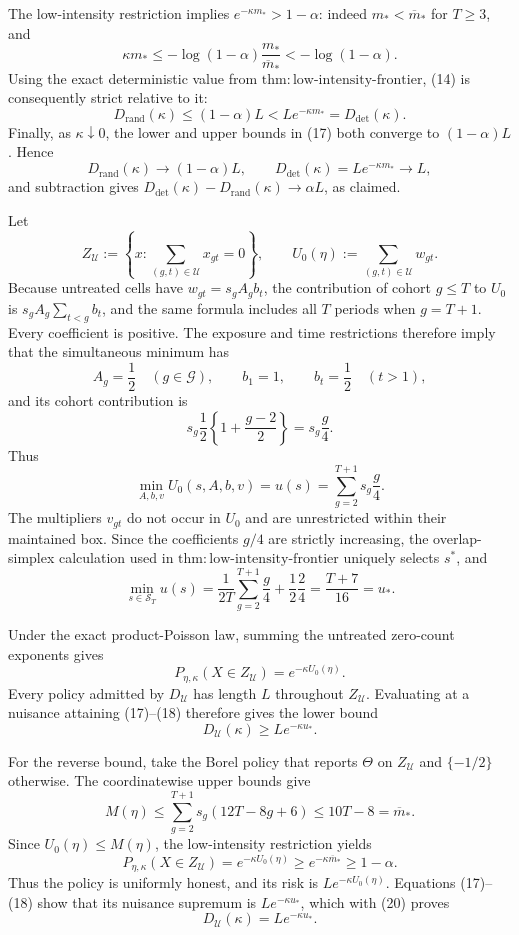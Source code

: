 The low-intensity restriction implies
\(e^{-\kappa m_*}>1-\alpha\): indeed \(m_*<\overline m_*\) for \(T\ge3\), and
\[
 \kappa m_*\le-\log(1-\alpha)\frac{m_*}{\overline m_*}
 <-\log(1-\alpha).
\]
Using the exact deterministic value from \(\mathrm{thm{:}low\text{-}intensity\text{-}frontier}\), (14) is consequently strict relative to it:
\[
 D_{\mathrm{rand}}(\kappa)\le(1-\alpha)L
 <Le^{-\kappa m_*}=D_{\mathrm{det}}(\kappa).
\]
Finally, as \(\kappa\downarrow0\), the lower and upper bounds in (17) both converge to \((1-\alpha)L\).  Hence
\[
 D_{\mathrm{rand}}(\kappa)\longrightarrow(1-\alpha)L,
 \qquad
 D_{\mathrm{det}}(\kappa)=Le^{-\kappa m_*}\longrightarrow L,
\]
and subtraction gives
\(D_{\mathrm{det}}(\kappa)-D_{\mathrm{rand}}(\kappa)\to\alpha L\), as claimed.

Let
\[
 Z_{\mathcal U}:=\left\{x:\sum_{(g,t)\in\mathcal U}x_{gt}=0\right\},
 \qquad
 U_0(\eta):=\sum_{(g,t)\in\mathcal U}w_{gt}.
\]
Because untreated cells have \(w_{gt}=s_gA_gb_t\), the contribution of cohort \(g\le T\) to \(U_0\) is \(s_gA_g\sum_{t<g}b_t\), and the same formula includes all \(T\) periods when \(g=T+1\).  Every coefficient is positive.  The exposure and time restrictions therefore imply that the simultaneous minimum has
\[
 A_g=\frac12\quad(g\in\mathcal G),
 \qquad b_1=1,
 \qquad b_t=\frac12\quad(t>1),
\]
and its cohort contribution is
\[
 s_g\frac12\left\{1+\frac{g-2}{2}\right\}
 =s_g\frac g4.
\]
Thus
\[
 \min_{A,b,v}U_0(s,A,b,v)
 =u(s)=\sum_{g=2}^{T+1}s_g\frac g4.
\tag{17}
\]
The multipliers \(v_{gt}\) do not occur in \(U_0\) and are unrestricted within their maintained box.  Since the coefficients \(g/4\) are strictly increasing, the overlap-simplex calculation used in \(\mathrm{thm{:}low\text{-}intensity\text{-}frontier}\) uniquely selects \(s^*\), and
\[
 \min_{s\in\mathcal S_T}u(s)
 =\frac{1}{2T}\sum_{g=2}^{T+1}\frac g4
  +\frac12\frac24
 =\frac{T+7}{16}=u_*.
\tag{18}
\]

Under the exact product-Poisson law, summing the untreated zero-count exponents gives
\[
 P_{\eta,\kappa}(X\in Z_{\mathcal U})
 =e^{-\kappa U_0(\eta)}.
\tag{19}
\]
Every policy admitted by \(D_{\mathcal U}\) has length \(L\) throughout \(Z_{\mathcal U}\).  Evaluating at a nuisance attaining (17)--(18) therefore gives the lower bound
\[
 D_{\mathcal U}(\kappa)\ge Le^{-\kappa u_*}.
\tag{20}
\]

For the reverse bound, take the Borel policy that reports \(\Theta\) on \(Z_{\mathcal U}\) and \(\{-1/2\}\) otherwise.  The coordinatewise upper bounds give
\[
 M(\eta)\le\sum_{g=2}^{T+1}s_g(12T-8g+6)
 \le10T-8=\overline m_*.
\]
Since \(U_0(\eta)\le M(\eta)\), the low-intensity restriction yields
\[
 P_{\eta,\kappa}(X\in Z_{\mathcal U})
 =e^{-\kappa U_0(\eta)}
 \ge e^{-\kappa\overline m_*}
 \ge1-\alpha.
\]
Thus the policy is uniformly honest, and its risk is \(Le^{-\kappa U_0(\eta)}\).  Equations (17)--(18) show that its nuisance supremum is \(Le^{-\kappa u_*}\), which with (20) proves
\[
 D_{\mathcal U}(\kappa)=Le^{-\kappa u_*}.
\tag{21}
\]

